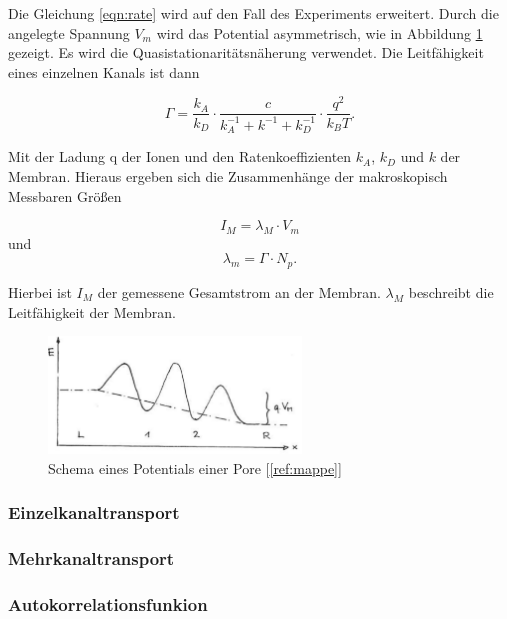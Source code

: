 \documentclass[a4paper,ngerman]{scrartcl}
\begin{document}
Die Gleichung \ref{eqn:rate} wird auf den Fall des Experiments erweitert. Durch die angelegte Spannung $V_{m}$ wird das Potential asymmetrisch, wie in Abbildung \ref{fig:potential-asym} gezeigt.  Es wird die Quasistationaritätsnäherung verwendet. Die Leitfähigkeit eines einzelnen Kanals ist dann

\begin{equation}
\Gamma = \frac{k_A}{k_D} \cdot \frac{c}{k_A^{-1}+k^{-1}+k_D^{-1}} \cdot  \frac{q^2}{k_B T} .
\end{equation}

Mit der Ladung q der Ionen und den Ratenkoeffizienten $k_A$, $k_D$ und $k$ der Membran.
Hieraus ergeben sich die Zusammenhänge der makroskopisch Messbaren Größen

\begin{equation}
I_M = \lambda_M \cdot V_m
\end{equation}
und
\begin{equation}
\lambda_m = \Gamma \cdot N_p.
\end{equation}

Hierbei ist $I_M$ der gemessene Gesamtstrom an der Membran. $\lambda_M$ beschreibt die Leitfähigkeit der Membran.


\begin{figure}
\includegraphics[width=0.6\textwidth]{potential-asym.png}
\caption{Schema eines Potentials einer Pore [\ref{ref:mappe}]}
\label{fig:potential-asym}
\end{figure}



\subsubsection{Einzelkanaltransport}




\subsubsection{Mehrkanaltransport}


\subsubsection{Autokorrelationsfunkion}
\end{document}
